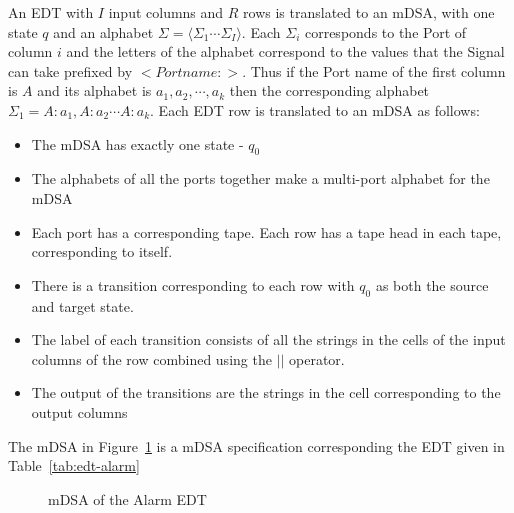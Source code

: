 An EDT with $I$ input columns and $R$ rows is translated to an mDSA, with one
state $q$ and an alphabet $\Sigma = \langle \Sigma_1 \cdots \Sigma_I \rangle$.
Each $\Sigma_i$ corresponds to the Port of column $i$ and the
letters of the alphabet correspond to the values that the Signal can take
prefixed by $<Portname:>$. Thus if the Port name of the first
column is $A$ and its alphabet is ${ a_1, a_2, \cdots, a_k}$ then the
corresponding alphabet $\Sigma_1 = {A:a_1, A:a_2 \cdots A:a_k}$. 
Each EDT row is translated to an mDSA as follows:
\begin{itemize}
\item The mDSA has exactly one state - $q_0$
\item 
The alphabets of all the ports together make a multi-port alphabet for the mDSA
\item
Each port has a corresponding tape. Each row has a tape head in each tape, corresponding to itself.
\item
There is a transition corresponding to each row with $q_0$ as both the source and target state. 
\item
The label of each transition consists of all the strings in the cells of the input columns of the row combined using the $||$ operator.
\item 
The output of the transitions are the strings in the cell corresponding to the output columns
\end{itemize}

The mDSA in Figure~\ref{fig:state-diagram} is a mDSA specification corresponding the EDT given in Table~\ref{tab:edt-alarm}

\begin{figure}[htbp]
    \centering
{}
\caption{mDSA of the Alarm EDT}
    \label{fig:state-diagram}
\end{figure}


